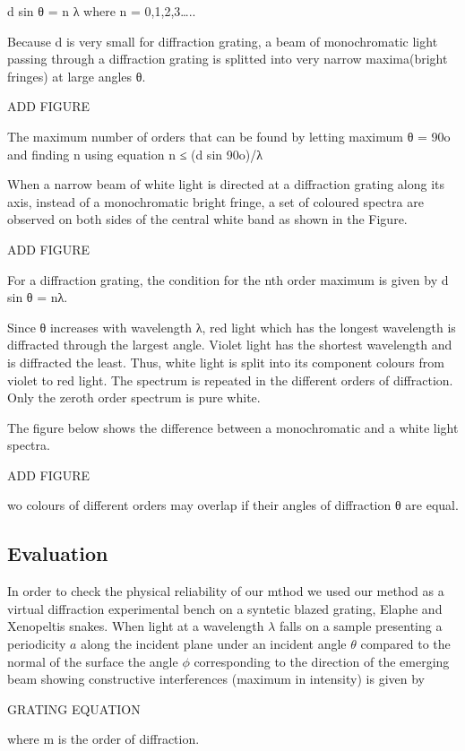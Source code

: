 d sin θ = n λ
where n = 0,1,2,3…..

Because d is very small for diffraction grating, a beam of monochromatic light passing through a diffraction grating is splitted into very narrow maxima(bright fringes) at large angles θ.

ADD FIGURE

The maximum number of orders that can be found by letting maximum θ = 90o and finding n using equation
n ≤ (d sin 90o)/λ

When a narrow beam of white light is directed at a diffraction grating along its axis, instead of a monochromatic bright fringe, a set of coloured spectra are observed on both sides of the central white band as shown in the Figure.

ADD FIGURE

For a diffraction grating, the condition for the nth order maximum is given by d sin θ = nλ.

Since θ increases with wavelength λ, red light which has the longest wavelength is diffracted through the largest angle. Violet light has the shortest wavelength and is diffracted the least. Thus, white light is split into its component colours from violet to red light. The spectrum is repeated in the different orders of diffraction. Only the zeroth order spectrum is pure white.

The figure below shows the difference between a monochromatic and a white light spectra.

ADD FIGURE

wo colours of different orders may overlap if their angles of diffraction θ are equal. 




\subsection{Evaluation}
In order to check the physical reliability of our mthod we used our method as a virtual diffraction experimental bench on a syntetic blazed grating, Elaphe and Xenopeltis snakes. When light at a wavelength $\lambda$ falls on a sample presenting a periodicity $a$ along the incident plane under an incident angle $\theta$ compared to the normal of the surface the angle $\phi$ corresponding to the direction of the emerging beam showing constructive interferences (maximum in intensity) is given by

GRATING EQUATION

where m is the order of diffraction. 

